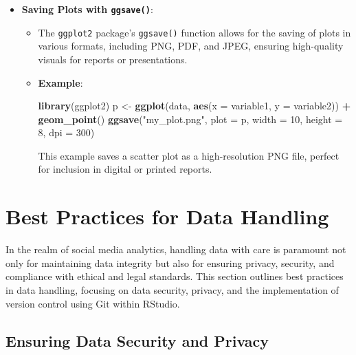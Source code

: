 \documentclass[
]{book}
\newenvironment{Shaded}{\begin{snugshade}}{\end{snugshade}}
\newcommand{\AttributeTok}[1]{\textcolor[rgb]{0.13,0.29,0.53}{#1}}
\newcommand{\DecValTok}[1]{\textcolor[rgb]{0.00,0.00,0.81}{#1}}
\newcommand{\FunctionTok}[1]{\textcolor[rgb]{0.13,0.29,0.53}{\textbf{#1}}}
\newcommand{\NormalTok}[1]{#1}
\newcommand{\OtherTok}[1]{\textcolor[rgb]{0.56,0.35,0.01}{#1}}
\newcommand{\SpecialCharTok}[1]{\textcolor[rgb]{0.81,0.36,0.00}{\textbf{#1}}}
\newcommand{\StringTok}[1]{\textcolor[rgb]{0.31,0.60,0.02}{#1}}
\providecommand{\tightlist}{%
  \setlength{\itemsep}{0pt}\setlength{\parskip}{0pt}}
\begin{document}
\begin{itemize}
\tightlist
\item
  \textbf{Saving Plots with \texttt{ggsave()}}:

  \begin{itemize}
  \item
    The \texttt{ggplot2} package's \texttt{ggsave()} function allows for the saving of plots in various formats, including PNG, PDF, and JPEG, ensuring high-quality visuals for reports or presentations.
  \item
    \textbf{Example}:

\begin{Shaded}
\begin{Highlighting}[]
\FunctionTok{library}\NormalTok{(ggplot2)}
\NormalTok{p }\OtherTok{\textless{}{-}} \FunctionTok{ggplot}\NormalTok{(data, }\FunctionTok{aes}\NormalTok{(}\AttributeTok{x =}\NormalTok{ variable1, }\AttributeTok{y =}\NormalTok{ variable2)) }\SpecialCharTok{+} \FunctionTok{geom\_point}\NormalTok{()}
\FunctionTok{ggsave}\NormalTok{(}\StringTok{"my\_plot.png"}\NormalTok{, }\AttributeTok{plot =}\NormalTok{ p, }\AttributeTok{width =} \DecValTok{10}\NormalTok{, }\AttributeTok{height =} \DecValTok{8}\NormalTok{, }\AttributeTok{dpi =} \DecValTok{300}\NormalTok{)}
\end{Highlighting}
\end{Shaded}

    This example saves a scatter plot as a high-resolution PNG file, perfect for inclusion in digital or printed reports.
  \end{itemize}
\end{itemize}

\hypertarget{best-practices-for-data-handling}{%
\section{Best Practices for Data Handling}\label{best-practices-for-data-handling}}

In the realm of social media analytics, handling data with care is paramount not only for maintaining data integrity but also for ensuring privacy, security, and compliance with ethical and legal standards. This section outlines best practices in data handling, focusing on data security, privacy, and the implementation of version control using Git within RStudio.

\hypertarget{ensuring-data-security-and-privacy}{%
\subsection{Ensuring Data Security and Privacy}\label{ensuring-data-security-and-privacy}}
\end{document}
